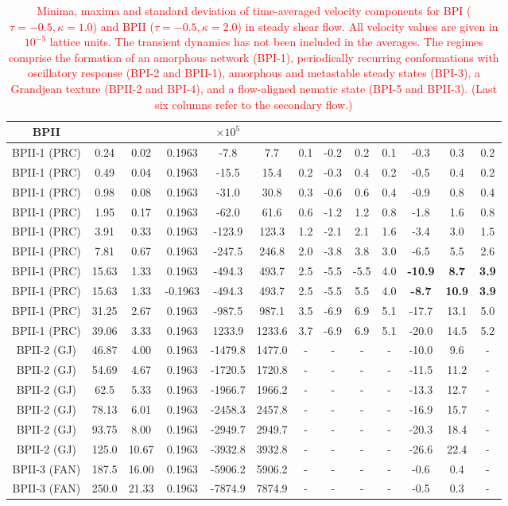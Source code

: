 \documentclass[8.5pt,twoside,twocolumn]{article}
\newcommand{\rev}[1]{{\textcolor{red}{#1}}}
\begin{document}
{\begin{table}[htpb]
\begin{tabular}{|c||c|| c || c || c |c |c||c| c| c||c| c| c|}
BPII  & & & & $\times 10^5$ \\
\hline
BPII-1 (PRC) &0.24 &0.02 & 0.1963 &-7.8 &7.7 &0.1 &-0.2 &0.2 &0.1 &-0.3 &0.3 &0.2 \\
BPII-1 (PRC) &0.49 &0.04 & 0.1963 &-15.5 &15.4 &0.2 &-0.3 &0.4 &0.2 &-0.5 &0.4 &0.2 \\
BPII-1 (PRC) &0.98 &0.08 & 0.1963 &-31.0 &30.8 &0.3 &-0.6 &0.6 &0.4 &-0.9 &0.8 &0.4 \\
BPII-1 (PRC) &1.95 &0.17 & 0.1963 &-62.0 &61.6 &0.6 &-1.2 &1.2 &0.8 &-1.8 &1.6 &0.8 \\
BPII-1 (PRC) &3.91 &0.33 & 0.1963 &-123.9 &123.3 &1.2 &-2.1 &2.1 &1.6 &-3.4 &3.0 &1.5 \\
BPII-1 (PRC) &7.81 &0.67 & 0.1963 &-247.5 &246.8 &2.0 &-3.8 &3.8 &3.0 &-6.5 &5.5 &2.6 \\
BPII-1 (PRC) &15.63 &1.33 & 0.1963 &-494.3 &493.7 &2.5 &-5.5 &-5.5 &4.0 &\bf{-10.9} &\bf{8.7} &\bf{3.9} \\
BPII-1 (PRC) &15.63 &1.33 & -0.1963 &-494.3 &493.7 &2.5 &-5.5 &5.5 &4.0 &\bf{-8.7} &\bf{10.9} &\bf{3.9} \\
BPII-1 (PRC) &31.25 &2.67 & 0.1963 &-987.5 &987.1 &3.5 &-6.9 &6.9 &5.1 &-17.7 &13.1 &5.0 \\
BPII-1 (PRC) &39.06 &3.33 & 0.1963 &1233.9 &1233.6 &3.7 &-6.9 &6.9 &5.1 &-20.0 &14.5 &5.2 \\
\hline
BPII-2 (GJ) &46.87 &4.00 & 0.1963 &-1479.8 &1477.0 &- &- &- &- &-10.0 &9.6  &- \\
BPII-2 (GJ) &54.69 &4.67 & 0.1963 &-1720.5 &1720.8 &- &- &- &- &-11.5 &11.2 &- \\
BPII-2 (GJ) &62.5 &5.33 & 0.1963  &-1966.7 &1966.2 &- &- &- &- &-13.3 &12.7 &- \\
BPII-2 (GJ) &78.13 &6.01 & 0.1963 &-2458.3 &2457.8 &- &- &- &- &-16.9 &15.7 &- \\
BPII-2 (GJ) &93.75 &8.00 & 0.1963 &-2949.7 &2949.7 &- &- &- &- &-20.3 &18.4 &- \\
BPII-2 (GJ) &125.0 &10.67 &0.1963 &-3932.8 &3932.8 &- &- &- &- &-26.6 &22.4 &- \\
\hline
BPII-3 (FAN) &187.5 &16.00 & 0.1963 &-5906.2  &5906.2 &- &-  &-  &-  &-0.6 &0.4 &- \\
BPII-3 (FAN) &250.0 &21.33 & 0.1963 &-7874.9  &7874.9 &- &-  &-  &-  &-0.5 &0.3 &- \\
\hline
\end{tabular}
\caption{\rev{Minima, maxima and standard deviation of time-averaged velocity components 
for BPI ($\tau=-0.5, \kappa=1.0$) and BPII ($\tau=-0.5, \kappa=2.0$) in steady 
shear flow. All velocity values are given in $10^{-5}$ lattice units. The transient dynamics 
has not been included in the averages. The regimes comprise the formation
of an amorphous network (BPI-1), periodically recurring conformations with oscillatory response (BPI-2 and BPII-1), 
amorphous and metastable steady states (BPI-3), a Grandjean texture (BPII-2 and BPI-4),
and a flow-aligned nematic state (BPI-5 and BPII-3).
(Last six columns refer to the secondary flow.)}}
\label{tab1}
\end{table}

}
\end{document}
